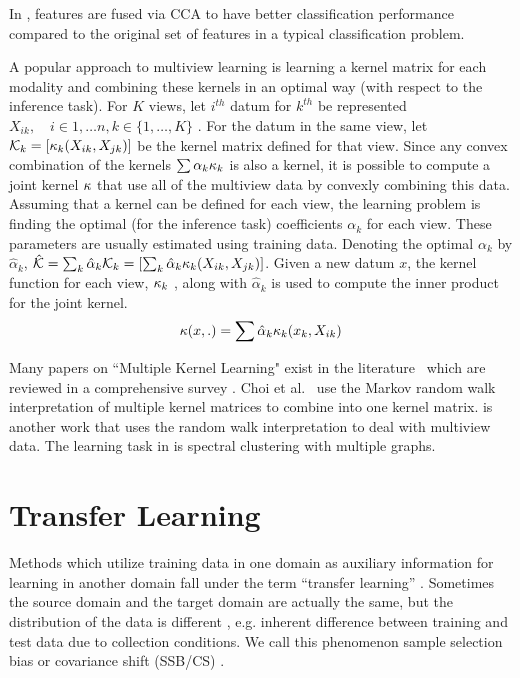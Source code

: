 \documentclass[12pt,oneside,final]{thesis}\usepackage[]{graphicx}\usepackage[]{color}
\begin{document}
In \cite{Sun2005}, features
are fused via CCA to have better classification performance compared to the original set of features in a typical classification problem.

A popular approach to multiview learning is learning a  kernel matrix for each modality and combining these kernels in an optimal way (with respect to the inference task). For $K$ views, let $i^{th}$ datum for $k^{th}$ be represented $X_{ik},\quad i \in {1,\ldots n}, k \in \{ 1,\ldots, K \}$ . For the datum in the same view, let ${\mathcal{K}}_{k} = \left[ \kappa_{k} (X_{ik},X_{jk}) \right] $ be the kernel matrix defined for that view.  Since any convex combination of the kernels $\sum{\alpha_k \kappa_{k} } $ is also a kernel, it is possible to compute a joint kernel $\kappa$ that use all of the multiview data by convexly combining this data. Assuming that a kernel can be defined for each view, the learning problem is  finding the optimal (for the inference task) coefficients $\alpha_k$ for each view. These parameters are usually estimated using training data. Denoting the optimal  $\alpha_k$ by  $\hat{\alpha}_k$,  $\hat{\mathcal{K}} = \sum_k{\hat{\alpha}_k \mathcal{K}_{k} }  =  \left[ \sum_k{\hat{\alpha}_k {\kappa_k} (X_{ik},X_{jk})} \right] $.  Given a new datum $x$, the kernel function for each view, $\kappa_{k}$ ,  along with $\hat{\alpha}_k$ is used to compute the inner product for the joint kernel. 
\[
{\kappa}(x,.)= \sum{\hat{\alpha}_k {\kappa_k} (x_{k},X_{ik})} 
\]

Many papers on ``Multiple Kernel Learning"   exist in the literature~\cite{McFee:2011:LMS:1953048.1953063,Lin2009,Lanckriet2004} which are reviewed in a comprehensive survey \cite{MKLSurvey}.
Choi et al.\ \cite{Choi:2008:MIM:1619995.1620064} use the Markov random walk interpretation of multiple kernel matrices to combine into one kernel matrix. \cite{ZhouBurges2007a} is another work that uses the random walk interpretation to deal with multiview data. The learning task in  \cite{ZhouBurges2007a} is spectral clustering with multiple graphs.

\section[Transfer Learning and Domain Adaptation]{Transfer Learning \label{sec:translearn}}

Methods which utilize training data in one domain  as auxiliary information for  learning  in another domain fall under the term ``transfer learning'' \cite{TransLearnSurvey}. Sometimes the source domain and the target domain are actually the same, but the distribution of the data is different , e.g. inherent difference between training and test data due to collection conditions. We call this phenomenon sample selection bias or covariance shift (SSB/CS) \cite{Zadrozny2004a,TransLearnSurvey}.
\end{document}
